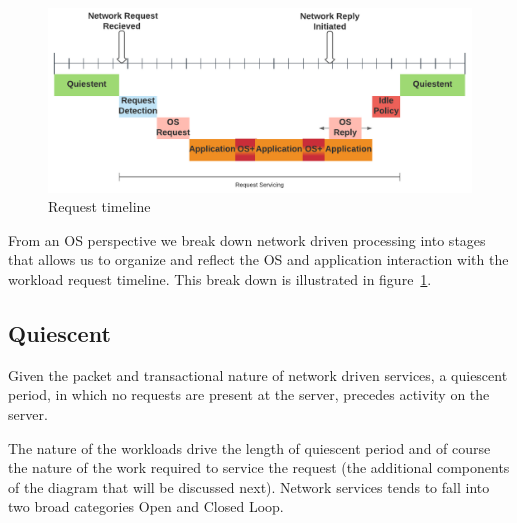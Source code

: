 
\begin{figure}
\centering
\includegraphics[width=1.1\columnwidth]{figures/timeline_chart}
\caption[]{Request timeline}
\label{fig:timeline}
\vspace{-0.28in}
\end{figure}

From an OS perspective we break down network driven processing into stages that allows us to organize and reflect the OS and application interaction with the workload request timeline. This break down is illustrated in figure~\ref{fig:timeline}.

\subsection{Quiescent}
\label{sec:workflow:Quiescent}
Given the packet and transactional nature of network driven services, a quiescent period, in which no requests are present at the server, precedes activity on the server. 

The nature of the workloads drive the length of quiescent period and of course the nature of the work required to service the request (the additional components of the diagram that will be discussed next).  Network services tends to fall into two broad categories Open and Closed Loop.   

